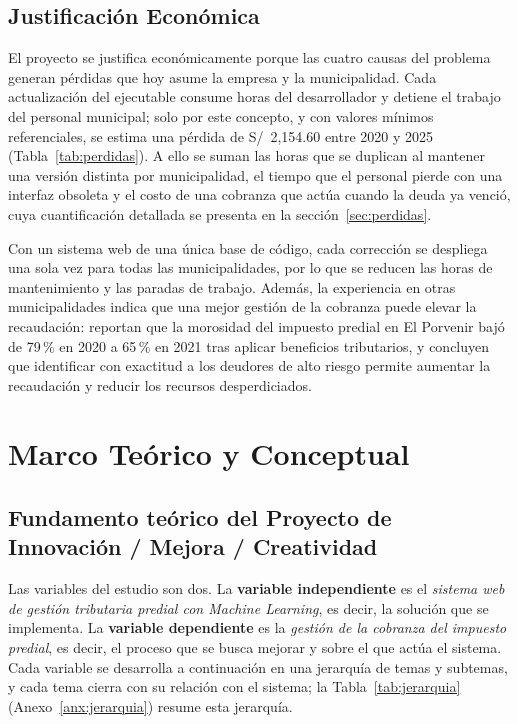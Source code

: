 \documentclass[12pt,a4paper]{report}
\begin{document}
\subsection{Justificación Económica}
\label{sec:just-econ}

El proyecto se justifica económicamente porque las cuatro causas del problema generan pérdidas que hoy asume la empresa y la municipalidad. Cada actualización del ejecutable consume horas del desarrollador y detiene el trabajo del personal municipal; solo por este concepto, y con valores mínimos referenciales, se estima una pérdida de S/~2,154.60 entre 2020 y 2025 (Tabla~\ref{tab:perdidas}). A ello se suman las horas que se duplican al mantener una versión distinta por municipalidad, el tiempo que el personal pierde con una interfaz obsoleta y el costo de una cobranza que actúa cuando la deuda ya venció, cuya cuantificación detallada se presenta en la sección~\ref{sec:perdidas}.

Con un sistema web de una única base de código, cada corrección se despliega una sola vez para todas las municipalidades, por lo que se reducen las horas de mantenimiento y las paradas de trabajo. Además, la experiencia en otras municipalidades indica que una mejor gestión de la cobranza puede elevar la recaudación: \textcite{riosvelasquez2022} reportan que la morosidad del impuesto predial en El Porvenir bajó de 79\,\% en 2020 a 65\,\% en 2021 tras aplicar beneficios tributarios, y \textcite{ourdani2024} concluyen que identificar con exactitud a los deudores de alto riesgo permite aumentar la recaudación y reducir los recursos desperdiciados.

\section{Marco Teórico y Conceptual}
\label{sec:marco}

\subsection{Fundamento teórico del Proyecto de Innovación / Mejora / Creatividad}

Las variables del estudio son dos. La \textbf{variable independiente} es el \textit{sistema web de gestión tributaria predial con Machine Learning}, es decir, la solución que se implementa. La \textbf{variable dependiente} es la \textit{gestión de la cobranza del impuesto predial}, es decir, el proceso que se busca mejorar y sobre el que actúa el sistema. Cada variable se desarrolla a continuación en una jerarquía de temas y subtemas, y cada tema cierra con su relación con el sistema; la Tabla~\ref{tab:jerarquia} (Anexo~\ref{anx:jerarquia}) resume esta jerarquía.
\end{document}
